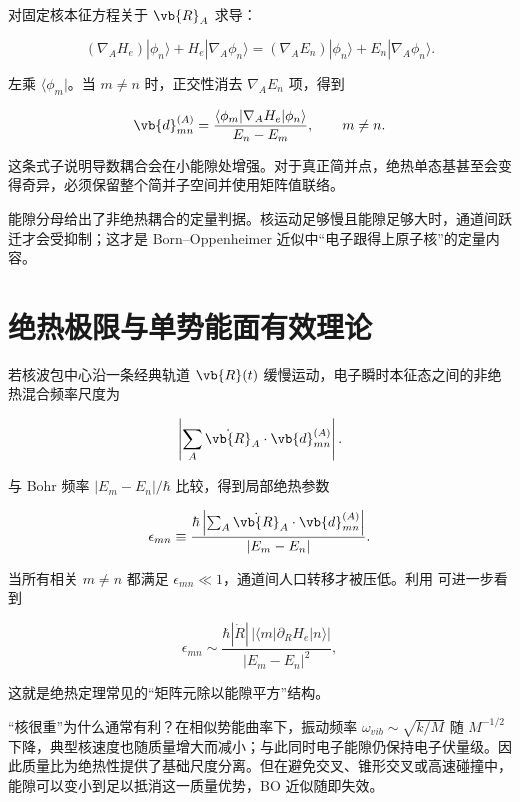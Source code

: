 对固定核本征方程关于 \(\vb{R}_A\) 求导：

\[
(\nabla_AH_e)|\phi_n\rangle
+H_e|\nabla_A\phi_n\rangle
=(\nabla_AE_n)|\phi_n\rangle
+E_n|\nabla_A\phi_n\rangle.
\]

左乘 \(\langle\phi_m|\)。当 \(m\neq n\) 时，正交性消去 \(\nabla_AE_n\) 项，得到

\begin{equation}
\vb{d}_{mn}^{(A)}
=\frac{\langle\phi_m|\nabla_AH_e|\phi_n\rangle}
{E_n-E_m},
\qquad m\neq n.
\label{eq:hellmann-feynman-offdiagonal}
\end{equation}

这条式子说明导数耦合会在小能隙处增强。对于真正简并点，绝热单态基甚至会变得奇异，必须保留整个简并子空间并使用矩阵值联络。

能隙分母给出了非绝热耦合的定量判据。核运动足够慢且能隙足够大时，通道间跃迁才会受抑制；这才是 Born--Oppenheimer 近似中“电子跟得上原子核”的定量内容。

\section{绝热极限与单势能面有效理论}

若核波包中心沿一条经典轨道 \(\vb{R}(t)\) 缓慢运动，电子瞬时本征态之间的非绝热混合频率尺度为

\[
\left|
\sum_A\dot{\vb{R}}_A\cdot\vb{d}_{mn}^{(A)}
\right|.
\]

与 Bohr 频率 \(|E_m-E_n|/\hbar\) 比较，得到局部绝热参数

\begin{equation}
\epsilon_{mn}
\equiv
\frac{\hbar\left|
\sum_A\dot{\vb{R}}_A\cdot\vb{d}_{mn}^{(A)}
\right|}
{|E_m-E_n|}.
\label{eq:bo-adiabatic-parameter}
\end{equation}

当所有相关 \(m\neq n\) 都满足 \(\epsilon_{mn}\ll1\)，通道间人口转移才被压低。利用  可进一步看到

\[
\epsilon_{mn}
\sim
\frac{\hbar|\dot R|\,|\langle m|\partial_RH_e|n\rangle|}
{|E_m-E_n|^2},
\]

这就是绝热定理常见的“矩阵元除以能隙平方”结构。

“核很重”为什么通常有利？在相似势能曲率下，振动频率 \(\omega_{vib}\sim\sqrt{k/M}\) 随 \(M^{-1/2}\) 下降，典型核速度也随质量增大而减小；与此同时电子能隙仍保持电子伏量级。因此质量比为绝热性提供了基础尺度分离。但在避免交叉、锥形交叉或高速碰撞中，能隙可以变小到足以抵消这一质量优势，BO 近似随即失效。

